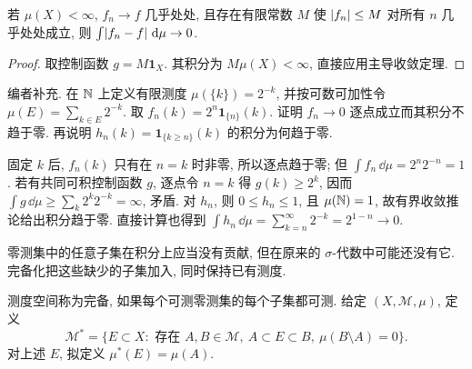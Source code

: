 \begin{corollary}[编者补充]\label{ra:c2:bounded-convergence}
若 $\mu(X)<\infty$, $f_n\to f$ 几乎处处, 且存在有限常数 $M$ 使 $\lvert f_n\rvert\le M$ 对所有 $n$ 几乎处处成立, 则 $\int\lvert f_n-f\rvert\,\,\mathrm d\mu\to0$.
\end{corollary}
\begin{proof}
取控制函数 $g=M\mathbf1_X$. 其积分为 $M\mu(X)<\infty$, 直接应用主导收敛定理.
\end{proof}

\begin{example}
编者补充. 在 $\mathbb N$ 上定义有限测度 $\mu(\{k\})=2^{-k}$, 并按可数可加性令 $\mu(E)=\sum_{k\in E}2^{-k}$. 取 $f_n(k)=2^n\mathbf1_{\{n\}}(k)$. 证明 $f_n\to0$ 逐点成立而其积分不趋于零. 再说明 $h_n(k)=\mathbf1_{\{k\ge n\}}(k)$ 的积分为何趋于零.
\end{example}
\begin{solution}
固定 $k$ 后, $f_n(k)$ 只有在 $n=k$ 时非零, 所以逐点趋于零; 但 $\int f_n\,\dd\mu=2^n2^{-n}=1$. 若有共同可积控制函数 $g$, 逐点令 $n=k$ 得 $g(k)\ge2^k$, 因而 $\int g\,\dd\mu\ge\sum_k2^k2^{-k}=\infty$, 矛盾. 对 $h_n$, 则 $0\le h_n\le1$, 且 $\mu(\mathbb N)=1$, 故有界收敛推论给出积分趋于零. 直接计算也得到 $\int h_n\,\dd\mu=\sum_{k=n}^{\infty}2^{-k}=2^{1-n}\to0$.
\end{solution}

零测集中的任意子集在积分上应当没有贡献, 但在原来的 $\sigma$-代数中可能还没有它. 完备化把这些缺少的子集加入, 同时保持已有测度.

\begin{definition}
测度空间称为完备, 如果每个可测零测集的每个子集都可测. 给定 $(X,\mathcal M,\mu)$, 定义
\[
 \mathcal M^*=\{E\subset X:\text{ 存在 }A,B\in\mathcal M,
       \ A\subset E\subset B,\ \mu(B\setminus A)=0\}.
\]
对上述 $E$, 拟定义 $\mu^*(E)=\mu(A)$.
\end{definition}

